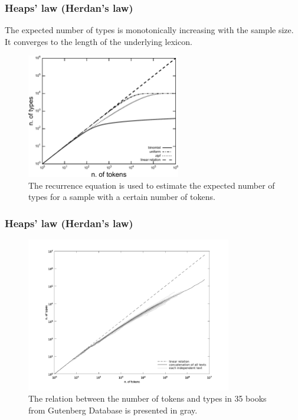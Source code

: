 \documentclass[notes]{beamer}
\begin{document}
\frame
{
  \frametitle{Heaps' law (Herdan's law)}  
  The expected number of types is monotonically increasing with the sample size. 
  It converges to the length of the underlying lexicon.

  \begin{figure}[h]
  \centering
  \includegraphics[width=0.6\textwidth]{images/heapslaw_rdist.pdf}
  \caption{The recurrence equation is used to estimate the expected number of types for a sample with a certain number of tokens.}
  \label{fig:heapslaw_rdist}
  \end{figure} 
}


\frame
{
  \frametitle{Heaps' law (Herdan's law)}
  \vspace{-0.3cm}
  \begin{figure}[h]
  \centering
  \includegraphics[width=0.8\textwidth]{images/heapslawtexts.png}
  \caption{The relation between the number of tokens and types in 35 books from Gutenberg Database is presented in gray.} 
  \label{fig:heapslawtexts}
  \end{figure}
}
\end{document}
